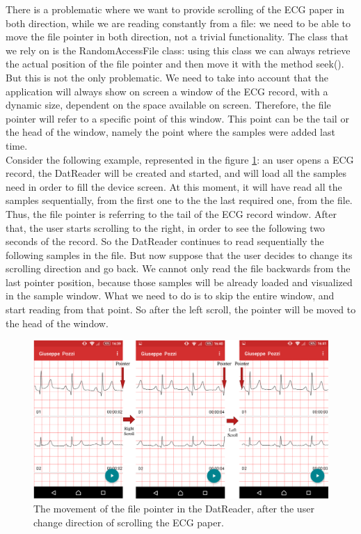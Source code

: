 There is a problematic where we want to provide scrolling of the ECG paper in both direction, while we are reading constantly from a file: we need to be able to move the file pointer in both direction, not a trivial functionality. The class that we rely on is the RandomAccessFile class: using this class we can always retrieve the actual position of the file pointer and then move it with the method seek(). But this is not the only problematic. We need to take into account that the application will always show on screen a window of the ECG record, with a dynamic size, dependent on the space available on screen. Therefore, the file pointer will refer to a specific point of this window. This point can be the tail or the head of the window, namely the point where the samples were added last time.\\
Consider the following example, represented in the figure \ref{fig9.2}: an user opens a ECG record, the DatReader will be created and started, and will load all the samples need in order to fill the device screen. At this moment, it will have read all the samples sequentially, from the first one to the the last required one, from the file. Thus, the file pointer is referring to the tail of the ECG record window. After that, the user starts scrolling to the right, in order to see the following two seconds of the record. So the DatReader continues to read sequentially the following samples in the file. But now suppose that the user decides to change its scrolling direction and go back. We cannot only read the file backwards from the last pointer position, because those samples will be already loaded and visualized in the sample window. What we need to do is to skip the entire window, and start reading from that point. So after the left scroll, the pointer will be moved to the head of the window.\\
\begin{figure}[ht!]
	\centering
	\includegraphics[width=140mm]{figures/ch9/2.png}
	\caption{The movement of the file pointer in the DatReader, after the user change direction of scrolling the ECG paper.}
	\label{fig9.2}
\end{figure}
